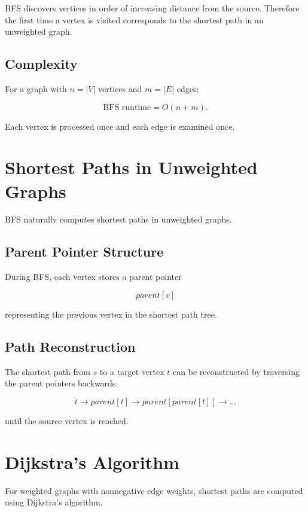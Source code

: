 \documentclass[11pt]{article}
\begin{document}
BFS discovers vertices in order of increasing distance from the source.
Therefore the first time a vertex is visited corresponds to the shortest path
in an unweighted graph.

\subsection{Complexity}

For a graph with $n = |V|$ vertices and $m = |E|$ edges:

\[
\text{BFS runtime} = O(n + m).
\]

Each vertex is processed once and each edge is examined once.

\section{Shortest Paths in Unweighted Graphs}

BFS naturally computes shortest paths in unweighted graphs.

\subsection{Parent Pointer Structure}

During BFS, each vertex stores a parent pointer

\[
parent[v]
\]

representing the previous vertex in the shortest path tree.

\subsection{Path Reconstruction}

The shortest path from $s$ to a target vertex $t$ can be reconstructed by
traversing the parent pointers backwards:

\[
t \rightarrow parent[t] \rightarrow parent[parent[t]] \rightarrow \dots
\]

until the source vertex is reached.

\section{Dijkstra's Algorithm}

For weighted graphs with nonnegative edge weights, shortest paths are computed
using Dijkstra's algorithm.
\end{document}
